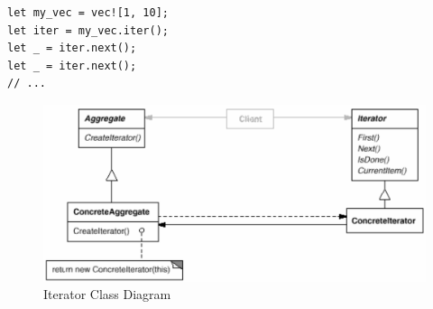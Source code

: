 \documentclass[11pt]{article}
\begin{document}
\lstset{language=rust,label= ,caption= ,captionpos=b,numbers=none}
\begin{lstlisting}
let my_vec = vec![1, 10];
let iter = my_vec.iter();
let _ = iter.next();
let _ = iter.next();
// ...
\end{lstlisting}


\begin{figure}[htbp]
\centering
\includegraphics[width=.9\linewidth]{img/iterator.png}
\caption{\label{fig:iterator-class-diagram}Iterator Class Diagram}
\end{figure}
\end{document}
